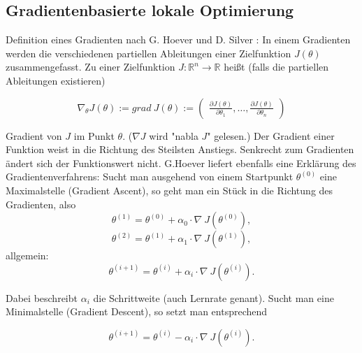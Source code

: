 \documentclass[conference]{IEEEtran}
\begin{document}
\subsection{Gradientenbasierte lokale Optimierung}
Definition eines Gradienten nach G. Hoever \cite[vgl. S. 213]{hoever_14} und D. Silver \cite{silver_15}: In einem Gradienten werden die verschiedenen partiellen Ableitungen einer Zielfunktion $J(\theta)$ zusammengefasst. Zu einer Zielfunktion $J : \mathbb{R}^n \rightarrow \mathbb{R}$ heißt (falls die partiellen Ableitungen existieren)

\begin{equation*}
\nabla_\theta J(\theta) := grad \: J(\theta) := \begin{pmatrix}
\frac{\partial J(\theta)}{\partial \theta_1}, \hdots, \frac{\partial J(\theta)}{\partial \theta_n}
\end{pmatrix}
\end{equation*}

Gradient von $J$ im Punkt $\theta$. ($\nabla J$ wird "nabla $J$" gelesen.) Der Gradient einer Funktion weist in die Richtung des Steilsten Anstiegs. Senkrecht zum Gradienten ändert sich der Funktionswert nicht. G.Hoever \cite[vgl. S. 214]{hoever_14} liefert ebenfalls eine Erklärung des Gradientenverfahrens: Sucht man ausgehend von einem Startpunkt $\theta^{(0)}$ eine Maximalstelle (Gradient Ascent), so geht man ein Stück in die Richtung des Gradienten, also
\begin{equation*}
\theta^{(1)} = \theta^{(0)} + \alpha_0 \cdot \nabla \: J(\theta^{(0)}),
\end{equation*}
\begin{equation*}
\theta^{(2)} = \theta^{(1)} + \alpha_1 \cdot \nabla \: J(\theta^{(1)}),
\end{equation*}
allgemein:
\begin{equation*}
\theta^{(i+1)} = \theta^{(i)} + \alpha_i \cdot \nabla \: J(\theta^{(i)}).
\end{equation*}

Dabei beschreibt $\alpha_i$ die Schrittweite (auch Lernrate genant). Sucht man eine Minimalstelle (Gradient Descent), so setzt man entsprechend 

\begin{equation*}
\theta^{(i+1)} = \theta^{(i)} - \alpha_i \cdot \nabla \: J(\theta^{(i)}).
\end{equation*}
\end{document}
